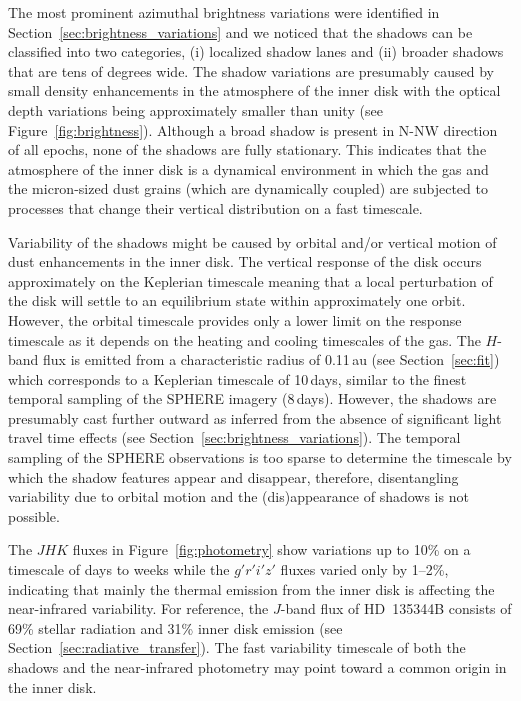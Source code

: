 \documentclass[twocolumn,tighten]{aastex61}
\begin{document}
The most prominent azimuthal brightness variations were identified in Section~\ref{sec:brightness_variations} and we noticed that the shadows can be classified into two categories, (i) localized shadow lanes and (ii) broader shadows that are tens of degrees wide. The shadow variations are presumably caused by small density enhancements in the atmosphere of the inner disk with the optical depth variations being approximately smaller than unity (see Figure~\ref{fig:brightness}). Although a broad shadow is present in N-NW direction of all epochs, none of the shadows are fully stationary. This indicates that the atmosphere of the inner disk is a dynamical environment in which the gas and the micron-sized dust grains (which are dynamically coupled) are subjected to processes that change their vertical distribution on a fast timescale.

Variability of the shadows might be caused by orbital and/or vertical motion of dust enhancements in the inner disk. The vertical response of the disk occurs approximately on the Keplerian timescale meaning that a local perturbation of the disk will settle to an equilibrium state within approximately one orbit. However, the orbital timescale provides only a lower limit on the response timescale as it depends on the heating and cooling timescales of the gas. The $H$-band flux is emitted from a characteristic radius of 0.11\,au (see Section~\ref{sec:fit}) which corresponds to a Keplerian timescale of 10\,days, similar to the finest temporal sampling of the SPHERE imagery (8\,days). However, the shadows are presumably cast further outward as inferred from the absence of significant light travel time effects (see Section~\ref{sec:brightness_variations}). The temporal sampling of the SPHERE observations is too sparse to determine the timescale by which the shadow features appear and disappear, therefore, disentangling variability due to orbital motion and the (dis)appearance of shadows is not possible.

The $JHK$ fluxes in Figure~\ref{fig:photometry} show variations up to 10\% on a timescale of days to weeks \citep[see also][]{grady2009,sitko2012} while the $g'r'i'z'$ fluxes varied only by 1--2\%, indicating that mainly the thermal emission from the inner disk is affecting the near-infrared variability. For reference, the $J$-band flux of HD~135344B consists of 69\% stellar radiation and 31\% inner disk emission (see Section~\ref{sec:radiative_transfer}). The fast variability timescale of both the shadows and the near-infrared photometry may point toward a common origin in the inner disk.
\end{document}
